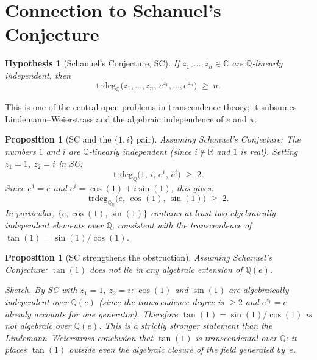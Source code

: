 \documentclass[11pt]{article}
\newtheorem{proposition}[theorem]{Proposition}
\newtheorem{hypothesis}{Hypothesis}
\newcommand{\trdeg}{\mathrm{trdeg}_{\mathbb{Q}}}
\begin{document}
\section{Connection to Schanuel's Conjecture}

\begin{hypothesis}[Schanuel's Conjecture, SC]\label{hyp:SC}
If $z_1, \ldots, z_n \in \mathbb{C}$ are $\mathbb{Q}$-linearly independent,
then
\[
  \trdeg\bigl(z_1, \ldots, z_n,\, e^{z_1}, \ldots, e^{z_n}\bigr) \;\geq\; n.
\]
\end{hypothesis}

This is one of the central open problems in transcendence theory; it subsumes
Lindemann–Weierstrass and the algebraic independence of $e$ and $\pi$.

\begin{proposition}[SC and the {$\{1, i\}$} pair]\label{prop:SC1i}
\emph{Assuming Schanuel's Conjecture:}  The numbers $1$ and $i$ are
$\mathbb{Q}$-linearly independent (since $i \notin \mathbb{R}$ and $1$ is
real).  Setting $z_1 = 1$, $z_2 = i$ in SC:
\[
  \trdeg\bigl(1,\, i,\, e^1,\, e^i\bigr) \;\geq\; 2.
\]
Since $e^1 = e$ and $e^i = \cos(1) + i\sin(1)$, this gives:
\[
  \trdeg_{\mathbb{Q}}\bigl(e,\, \cos(1),\, \sin(1)\bigr) \;\geq\; 2.
\]
In particular, $\{e, \cos(1), \sin(1)\}$ contains at least two algebraically
independent elements over $\mathbb{Q}$, consistent with the transcendence of
$\tan(1) = \sin(1)/\cos(1)$.
\end{proposition}

\begin{proposition}[SC strengthens the obstruction]\label{prop:SCstrength}
\emph{Assuming Schanuel's Conjecture:}  $\tan(1)$ does not lie in any
algebraic extension of $\mathbb{Q}(e)$.

\medskip
\noindent\emph{Sketch.}  By SC with $z_1 = 1$, $z_2 = i$:
$\cos(1)$ and $\sin(1)$ are algebraically independent over $\mathbb{Q}(e)$
(since the transcendence degree is $\geq 2$ and $e^{z_1} = e$ already
accounts for one generator).  Therefore $\tan(1) = \sin(1)/\cos(1)$ is not
algebraic over $\mathbb{Q}(e)$.  This is a strictly stronger statement than
the Lindemann–Weierstrass conclusion that $\tan(1)$ is transcendental over
$\mathbb{Q}$: it places $\tan(1)$ outside even the algebraic closure of the
field generated by~$e$.
\end{proposition}
\end{document}
